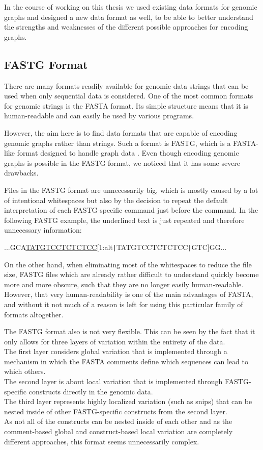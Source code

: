 \documentclass[a4paper,12pt,twoside,BCOR=10mm]{scrbook}
\def\pipe{\texttt{|}}
\begin{document}
In the course of working on this thesis we used existing data 
formats for genomic graphs and designed a new data format as well, 
to be able to better understand the strengths and weaknesses of 
the different possible approaches for encoding graphs.

\subsection{FASTG Format}

There are many formats readily available for genomic data strings 
that can be used when only sequential data is considered. 
One of the most common formats for genomic strings is the FASTA format. 
Its simple structure means that it is human-readable 
and can easily be used by various programs.

However, the aim here is to find data formats that are capable of 
encoding genomic graphs rather than strings. 
Such a format is FASTG, which is 
a FASTA-like format designed to handle graph data \citep{specFASTG}. 
Even though encoding genomic graphs is possible in the FASTG format, 
we noticed that it has some severe drawbacks.

Files in the FASTG format are unnecessarily big, which is mostly caused 
by a lot of intentional whitespaces but also by the decision to repeat the 
default interpretation of each FASTG-specific command just before the command. 
In the following FASTG example, the underlined 
text is just repeated and therefore unnecessary information:

...GCA\underline{TATGTCCTCTCTCC}[1:alt\pipe TATGTCCTCTCTCC\pipe GTC]GG...

On the other hand, when eliminating most of the whitespaces to reduce the file size, 
FASTG files which are already rather difficult to understand quickly 
become more and more obscure, such that they are no longer easily human-readable. 
However, that very human-readability is one of the main advantages of FASTA, 
and without it not much of a reason is left for using this particular family 
of formats altogether.

The FASTG format also is not very flexible. This can be seen by the fact that 
it only allows for three layers of variation within the entirety of the data. \\
The first layer considers global variation that is implemented through a mechanism in which the 
FASTA comments define which sequences can lead to which others. \\
The second layer is about local variation that is implemented through FASTG-specific constructs 
directly in the genomic data. \\
The third layer represents highly localized variation (such as snips) that can be nested 
inside of other FASTG-specific constructs from the second layer. \\
As not all of the constructs can be nested inside of each other 
and as the comment-based global and construct-based local 
variation are completely different approaches, this format 
seems unnecessarily complex.
\end{document}

